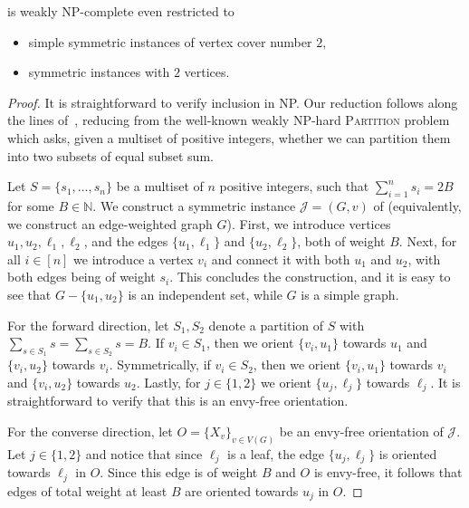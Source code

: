 \begin{theoremrep}[\appsymb]\label{thm:ef:weak_np_hardness}
    {\EFo} is weakly NP-complete even restricted to
    \begin{itemize}
        \item simple symmetric instances of vertex cover number $2$,
        \item symmetric instances with $2$ vertices.
    \end{itemize}
\end{theoremrep}

\begin{proof}
    It is straightforward to verify inclusion in NP.
    Our reduction follows along the lines of~\cite[Theorem 3]{ijcai/DeligkasEGK25},
    reducing from the well-known weakly NP-hard \textsc{Partition} problem which asks,
    given a multiset of positive integers, whether we can partition them into two subsets of equal subset sum.

    Let $S = \{ s_1, \ldots, s_n \}$ be a multiset of $n$ positive integers,
    such that $\sum_{i=1}^n s_i = 2B$ for some $B \in \mathbb{N}$.
    We construct a symmetric instance $\mathcal{J} = (G,v)$ of {\EFo} (equivalently,
    we construct an edge-weighted graph $G$).
    First, we introduce vertices $u_1, u_2, \ell_1, \ell_2$, and the edges $\{ u_1, \ell_1 \}$ and $\{ u_2 , \ell_2 \}$, both of weight $B$.
    Next, for all $i \in [n]$ we introduce a vertex $v_i$ and connect it with both $u_1$ and $u_2$, with both edges being of weight $s_i$.
    This concludes the construction, and it is easy to see that $G - \{u_1,u_2\}$ is an independent set, while $G$ is a simple graph.

    For the forward direction, let $S_1, S_2$ denote a partition of $S$ with $\sum_{s \in S_1} s = \sum_{s \in S_2} s = B$.
    If $v_i \in S_1$, then we orient $\{ v_i, u_1 \}$ towards $u_1$ and $\{ v_i , u_2 \}$ towards $v_i$.
    Symmetrically, if $v_i \in S_2$, then we orient $\{ v_i, u_1 \}$ towards $v_i$ and $\{ v_i , u_2 \}$ towards $u_2$.
    Lastly, for $j \in \{1,2\}$ we orient $\{ u_j, \ell_j \}$ towards $\ell_j$.
    It is straightforward to verify that this is an envy-free orientation.

    For the converse direction, let $O = \{X_v\}_{v \in V(G)}$ be an envy-free orientation of $\mathcal{J}$.
    Let $j \in \{1,2\}$ and notice that since $\ell_j$ is a leaf, the edge $\{u_j,\ell_j\}$ is oriented towards $\ell_j$ in $O$.
    Since this edge is of weight $B$ and $O$ is envy-free, it follows that edges of total weight at least $B$ are oriented towards $u_j$ in $O$.


\end{proof}
